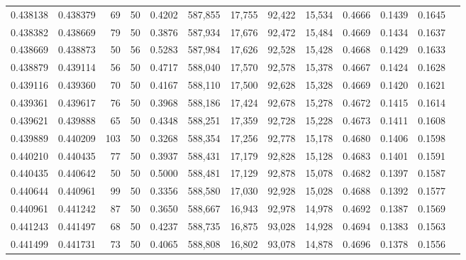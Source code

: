 \begin{tabular}{rrrrrrrrrrrrr}
0.438138 & 0.438379 &    69 &  50 &                                     0.4202 & 587,855 &  17,755 &  92,422 &  15,534 & 0.4666 & 0.1439 & 0.1645 \\
0.438382 & 0.438669 &    79 &  50 &                                     0.3876 & 587,934 &  17,676 &  92,472 &  15,484 & 0.4669 & 0.1434 & 0.1637 \\
0.438669 & 0.438873 &    50 &  56 &                                     0.5283 & 587,984 &  17,626 &  92,528 &  15,428 & 0.4668 & 0.1429 & 0.1633 \\
0.438879 & 0.439114 &    56 &  50 &                                     0.4717 & 588,040 &  17,570 &  92,578 &  15,378 & 0.4667 & 0.1424 & 0.1628 \\
0.439116 & 0.439360 &    70 &  50 &                                     0.4167 & 588,110 &  17,500 &  92,628 &  15,328 & 0.4669 & 0.1420 & 0.1621 \\
0.439361 & 0.439617 &    76 &  50 &                                     0.3968 & 588,186 &  17,424 &  92,678 &  15,278 & 0.4672 & 0.1415 & 0.1614 \\
0.439621 & 0.439888 &    65 &  50 &                                     0.4348 & 588,251 &  17,359 &  92,728 &  15,228 & 0.4673 & 0.1411 & 0.1608 \\
0.439889 & 0.440209 &   103 &  50 &                                     0.3268 & 588,354 &  17,256 &  92,778 &  15,178 & 0.4680 & 0.1406 & 0.1598 \\
0.440210 & 0.440435 &    77 &  50 &                                     0.3937 & 588,431 &  17,179 &  92,828 &  15,128 & 0.4683 & 0.1401 & 0.1591 \\
0.440435 & 0.440642 &    50 &  50 &                                     0.5000 & 588,481 &  17,129 &  92,878 &  15,078 & 0.4682 & 0.1397 & 0.1587 \\
0.440644 & 0.440961 &    99 &  50 &                                     0.3356 & 588,580 &  17,030 &  92,928 &  15,028 & 0.4688 & 0.1392 & 0.1577 \\
0.440961 & 0.441242 &    87 &  50 &                                     0.3650 & 588,667 &  16,943 &  92,978 &  14,978 & 0.4692 & 0.1387 & 0.1569 \\
0.441243 & 0.441497 &    68 &  50 &                                     0.4237 & 588,735 &  16,875 &  93,028 &  14,928 & 0.4694 & 0.1383 & 0.1563 \\
0.441499 & 0.441731 &    73 &  50 &                                     0.4065 & 588,808 &  16,802 &  93,078 &  14,878 & 0.4696 & 0.1378 & 0.1556 \\

\end{tabular}

